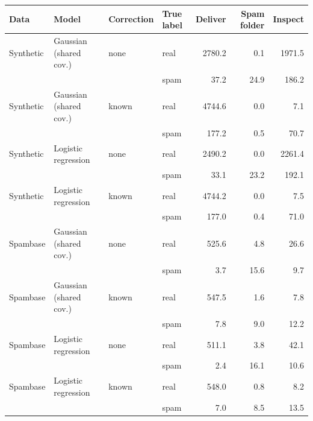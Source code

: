 \begin{tabular}{llll rrr}
\toprule
Data & Model & Correction & True label & Deliver & Spam folder & Inspect \\
\midrule
Synthetic & Gaussian (shared cov.) & none & real & 2780.2 & 0.1 & 1971.5 \\
 & & & spam & 37.2 & 24.9 & 186.2 \\[2pt]
Synthetic & Gaussian (shared cov.) & known & real & 4744.6 & 0.0 & 7.1 \\
 & & & spam & 177.2 & 0.5 & 70.7 \\[2pt]
\midrule
Synthetic & Logistic regression & none & real & 2490.2 & 0.0 & 2261.4 \\
 & & & spam & 33.1 & 23.2 & 192.1 \\[2pt]
Synthetic & Logistic regression & known & real & 4744.2 & 0.0 & 7.5 \\
 & & & spam & 177.0 & 0.4 & 71.0 \\[2pt]
\midrule
Spambase & Gaussian (shared cov.) & none & real & 525.6 & 4.8 & 26.6 \\
 & & & spam & 3.7 & 15.6 & 9.7 \\[2pt]
Spambase & Gaussian (shared cov.) & known & real & 547.5 & 1.6 & 7.8 \\
 & & & spam & 7.8 & 9.0 & 12.2 \\[2pt]
\midrule
Spambase & Logistic regression & none & real & 511.1 & 3.8 & 42.1 \\
 & & & spam & 2.4 & 16.1 & 10.6 \\[2pt]
Spambase & Logistic regression & known & real & 548.0 & 0.8 & 8.2 \\
 & & & spam & 7.0 & 8.5 & 13.5 \\[2pt]
\bottomrule
\end{tabular}
